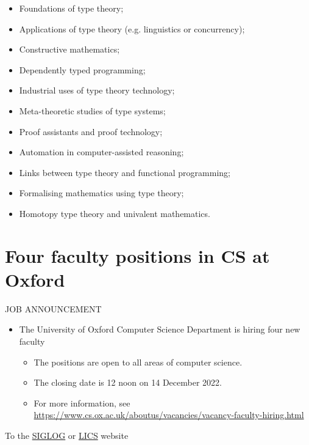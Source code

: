 \documentclass[prodmode,acmtecs]{acmsmall} %
\begin{document}
\begin{itemize}
\begin{itemize}\item  Foundations of type theory; 
\item  Applications of type theory (e.g. linguistics or concurrency); 
\item  Constructive mathematics; 
\item  Dependently typed programming; 
\item  Industrial uses of type theory technology; 
\item  Meta-theoretic studies of type systems; 
\item  Proof assistants and proof technology; 
\item  Automation in computer-assisted reasoning; 
\item  Links between type theory and functional programming; 
\item  Formalising mathematics using type theory; 
\item  Homotopy type theory and univalent mathematics. 
\end{itemize} 
\end{itemize}\section{Four faculty positions in CS at Oxford}\label{FourfacultypositionsinCSatOxford}JOB ANNOUNCEMENT 

\begin{itemize}\item  The University of Oxford Computer Science Department is hiring four new faculty 
 
\begin{itemize}\item  The positions are open to all areas of computer science.
\item  The closing date is 12 noon on 14 December 2022. 
\item  For more information, see \href{https://www.cs.ox.ac.uk/aboutus/vacancies/vacancy-faculty-hiring.html}{https://www.cs.ox.ac.uk/aboutus/vacancies/vacancy-faculty-hiring.html}
\end{itemize} 
\end{itemize}


To the \href{http://siglog.org/}{SIGLOG} or \href{https://lics.siglog.org}{LICS} website
\end{document}

